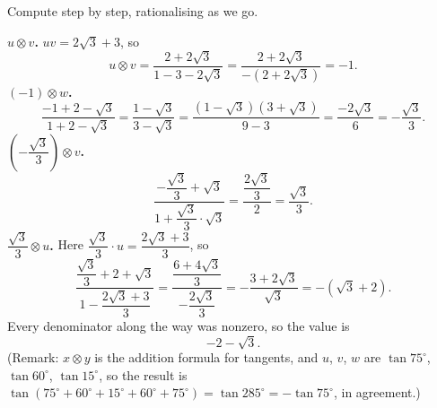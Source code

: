 Compute step by step, rationalising as we go.

\textbf{$u\otimes v$.} $uv=2\sqrt3+3$, so
\[
u\otimes v=\dfrac{2+2\sqrt3}{1-3-2\sqrt3}=\dfrac{2+2\sqrt3}{-(2+2\sqrt3)}=-1 .
\]
\textbf{$(-1)\otimes w$.}
\[
\dfrac{-1+2-\sqrt3}{1+2-\sqrt3}=\dfrac{1-\sqrt3}{3-\sqrt3}=\dfrac{(1-\sqrt3)(3+\sqrt3)}{9-3}=\dfrac{-2\sqrt3}{6}=-\dfrac{\sqrt3}{3}.
\]
\textbf{$\left(-\dfrac{\sqrt3}{3}\right)\otimes v$.}
\[
\dfrac{-\dfrac{\sqrt3}{3}+\sqrt3}{1+\dfrac{\sqrt3}{3}\cdot\sqrt3}=\dfrac{\dfrac{2\sqrt3}{3}}{2}=\dfrac{\sqrt3}{3}.
\]
\textbf{$\dfrac{\sqrt3}{3}\otimes u$.} Here $\dfrac{\sqrt3}{3}\cdot u=\dfrac{2\sqrt3+3}{3}$, so
\[
\dfrac{\dfrac{\sqrt3}{3}+2+\sqrt3}{1-\dfrac{2\sqrt3+3}{3}}=\dfrac{\dfrac{6+4\sqrt3}{3}}{-\dfrac{2\sqrt3}{3}}=-\dfrac{3+2\sqrt3}{\sqrt3}=-\left(\sqrt3+2\right).
\]
Every denominator along the way was nonzero, so the value is
\[
\boxed{-2-\sqrt3}.
\]
(Remark: $x\otimes y$ is the addition formula for tangents, and $u$, $v$, $w$ are $\tan75^\circ$, $\tan60^\circ$, $\tan15^\circ$, so the result is $\tan(75^\circ+60^\circ+15^\circ+60^\circ+75^\circ)=\tan285^\circ=-\tan75^\circ$, in agreement.)
